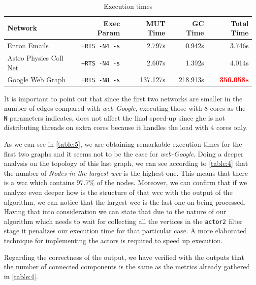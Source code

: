 \documentclass[preprint]{elsarticle}
\begin{document}
\begin{table}[H]
  \centering
  \begin{tabular}{|l|r|r|r|r|}
   \hline
   \textbf{Network} & \textbf{Exec Param} & \textbf{MUT Time} & \textbf{GC Time} & \textbf{Total Time}\\
   \hline
   Enron Emails & \texttt{+RTS -N4 -s} & 2.797s & 0.942s & 3.746s \\
   \hline
   Astro Physics Coll Net & \texttt{+RTS -N4 -s} & 2.607s & 1.392s & 4.014s \\
   \hline
   Google Web Graph & \texttt{+RTS -N8 -s} & 137.127s & 218.913s & \textbf{\textcolor{red}{356.058s}} \\
   \hline
  \end{tabular}
 \caption{Execution times}
 \label{table:5}
 \end{table}

It is important to point out that since the first two networks are smaller in the number of edges compared with \emph{web-Google}, executing those with $8$ cores as the \texttt{-N} parameters indicates, does not affect the final speed-up since \acrshort{ghc} is not distributing threads on extra cores because it handles the load with $4$ cores only.

As we can see in \autoref{table:5}, we are obtaining remarkable execution times for the first two graphs and it seems not to be the case for \textit{web-Google}. Doing a deeper analysis on the topology of this last graph, we can see according to \autoref{table:4} that the number of \textit{Nodes in the largest \acrshort{wcc}} is the highest one. This means that there is a \acrshort{wcc} which contains $97.7\%$ of the nodes. Moreover, we can confirm that if we analyze even deeper how is the structure of that \acrshort{wcc} with the output of the algorithm, we can notice that the largest \acrshort{wcc} is the last one on being processed. Having that into consideration we can state that due to the nature of our algorithm which needs to wait for collecting all the vertices in the \texttt{actor2} filter stage 
it penalizes our execution time for that particular case. A more elaborated technique for implementing the actors is required to speed up execution. 

Regarding the correctness of the output, we have verified with the outputs that the number of connected components is the same as the metrics already gathered in \autoref{table:4}.
\end{document}
